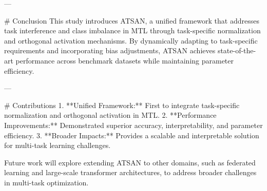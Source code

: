 ---

# Conclusion  
This study introduces ATSAN, a unified framework that addresses task interference and class imbalance in MTL through task-specific normalization and orthogonal activation mechanisms. By dynamically adapting to task-specific requirements and incorporating bias adjustments, ATSAN achieves state-of-the-art performance across benchmark datasets while maintaining parameter efficiency.  

---

# Contributions  
1. **Unified Framework:** First to integrate task-specific normalization and orthogonal activation in MTL.  
2. **Performance Improvements:** Demonstrated superior accuracy, interpretability, and parameter efficiency.  
3. **Broader Impacts:** Provides a scalable and interpretable solution for multi-task learning challenges.  

Future work will explore extending ATSAN to other domains, such as federated learning and large-scale transformer architectures, to address broader challenges in multi-task optimization.  
